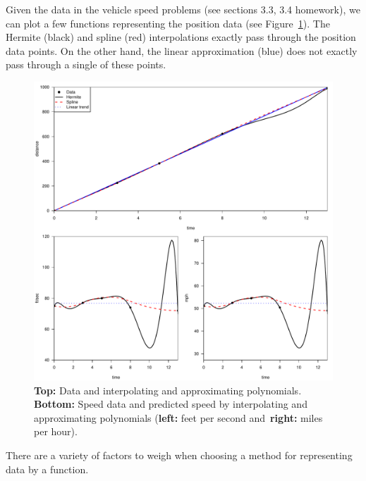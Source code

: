 \documentclass[12pt]{article}
\begin{document}
Given the data in the vehicle speed problems (see sections 3.3, 3.4 homework), we can plot a few functions representing the position data (see Figure~\ref{fig::plots}).  The Hermite (black) and spline (red) interpolations exactly pass through the position data points.  On the other hand, the linear approximation (blue) does not exactly pass through a single of these points.
%
\begin{figure}[h!]\centering
\includegraphics[width=\textwidth]{speed}
\caption{\textbf{Top:} Data and interpolating and approximating polynomials. \textbf{Bottom:} Speed data and predicted speed by interpolating and approximating polynomials (\textbf{left:} feet per second and~\textbf{right:} miles per hour).}\label{fig::plots}
\end{figure}

\noindent There are a variety of factors to weigh when choosing a method for representing data by a function.
%
\end{document}
